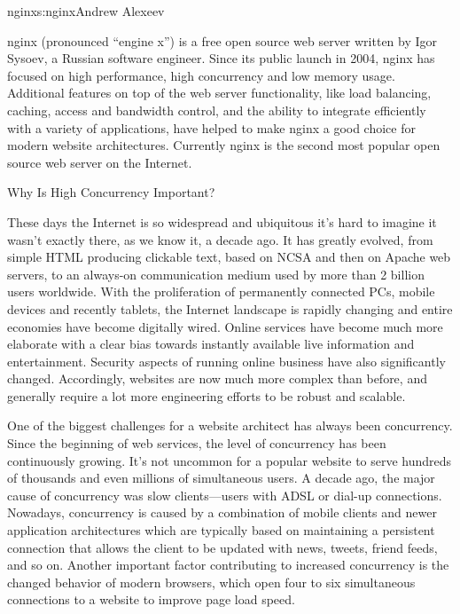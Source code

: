 \begin{aosachapter}{nginx}{s:nginx}{Andrew Alexeev}

nginx (pronounced ``engine x'') is a free open source web server
written by Igor Sysoev, a Russian software engineer. Since its public
launch in 2004, nginx has focused on high performance, high
concurrency and low memory usage. Additional features on top of the
web server functionality, like load balancing, caching, access and
bandwidth control, and the ability to integrate efficiently with a
variety of applications, have helped to make nginx a good choice for
modern website architectures. Currently nginx is the second most
popular open source web server on the Internet.

\begin{aosasect1}{Why Is High Concurrency Important?}


These days the Internet is so widespread and ubiquitous it's hard to
imagine it wasn't exactly there, as we know it, a decade ago. It has greatly evolved,
from simple HTML producing clickable text, based on NCSA and then on
Apache web servers, to an always-on communication medium used by more
than 2 billion users worldwide. With the proliferation of permanently
connected PCs, mobile devices and recently tablets, the Internet
landscape is rapidly changing and entire economies have become
digitally wired. Online services have become much more elaborate with
a clear bias towards instantly available live information and
entertainment. Security aspects of running online business have also
significantly changed. Accordingly, websites are now much more complex
than before, and generally require a lot more engineering efforts to
be robust and scalable.

One of the biggest challenges for a website architect has always been
concurrency. Since the beginning of web services, the level of
concurrency has been continuously growing. It's not uncommon for a
popular website to serve hundreds of thousands and even millions of
simultaneous users. A decade ago, the major cause of concurrency was
slow clients---users with ADSL or dial-up connections. Nowadays,
concurrency is caused by a combination of mobile clients and newer
application architectures which are typically based on maintaining a
persistent connection that allows the client to be updated with news,
tweets, friend feeds, and so on. Another important factor contributing
to increased concurrency is the changed behavior of modern browsers,
which open four to six simultaneous connections to a website to
improve page load speed.


\end{aosasect1}
\end{aosachapter}
